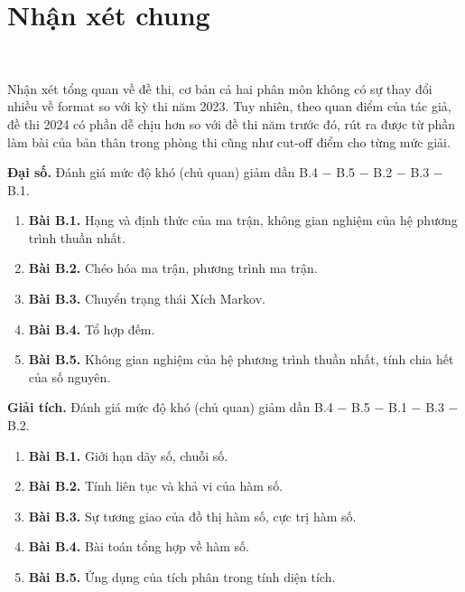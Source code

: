 \section{Nhận xét chung}
~

Nhận xét tổng quan về đề thi, cơ bản cả hai phân môn không có sự thay đổi nhiều về format so với kỳ thi năm 2023. Tuy nhiên, theo quan điểm của tác giả, đề thi 2024 có phần dễ chịu hơn so với đề thi năm trước đó, rút ra được từ phần làm bài của bản thân trong phòng thi cũng như cut-off điểm cho từng mức giải. 

\textbf{Đại số. } Đánh giá mức độ khó (chủ quan) giảm dần B.4 $-$ B.5 $-$ B.2 $-$ B.3 $-$ B.1.
    \begin{enumerate}
        \item[] {\textbf{Bài B.1.} Hạng và định thức của ma trận, không gian nghiệm của hệ phương trình thuần nhất.}
        \item[] {\textbf{Bài B.2.} Chéo hóa ma trận, phương trình ma trận.}
        \item[] {\textbf{Bài B.3.} Chuyển trạng thái Xích Markov.}
        \item[] {\textbf{Bài B.4.} Tổ hợp đếm.}
        \item[] {\textbf{Bài B.5.} Không gian nghiệm của hệ phương trình thuần nhất, tính chia hết của số nguyên.}
    \end{enumerate}

\textbf{Giải tích. } Đánh giá mức độ khó (chủ quan) giảm dần B.4 $-$ B.5 $-$ B.1 $-$ B.3 $-$ B.2.
    \begin{enumerate}
        \item[] {\textbf{Bài B.1.} Giới hạn dãy số, chuỗi số.}
        \item[] {\textbf{Bài B.2.} Tính liên tục và khả vi của hàm số.}
        \item[] {\textbf{Bài B.3.} Sự tương giao của đồ thị hàm số, cực trị hàm số.}
        \item[] {\textbf{Bài B.4.} Bài toán tổng hợp về hàm số.}
        \item[] {\textbf{Bài B.5.} Ứng dụng của tích phân trong tính diện tích.}
    \end{enumerate}